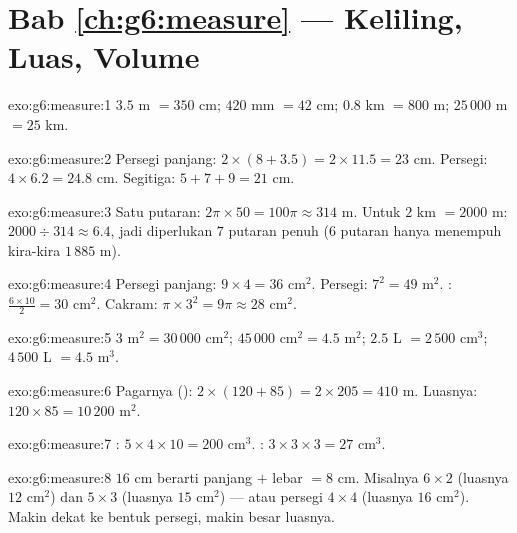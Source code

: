\section*{Bab \ref{ch:g6:measure} --- Keliling, Luas, Volume}

\begin{solution}{exo:g6:measure:1}
$3.5$ m $= 350$ cm; \quad $420$ mm $= 42$ cm; \quad
$0.8$ km $= 800$ m; \quad $25\,000$ m $= 25$ km.
\end{solution}

\begin{solution}{exo:g6:measure:2}
Persegi panjang: $2 \times (8 + 3.5) = 2 \times 11.5 = 23$ cm.
Persegi: $4 \times 6.2 = 24.8$ cm.
Segitiga: $5 + 7 + 9 = 21$ cm.
\end{solution}

\begin{solution}{exo:g6:measure:3}
Satu putaran: $2\pi \times 50 = 100\pi \approx 314$ m. Untuk $2$ km
$= 2000$ m: $2000 \div 314 \approx 6.4$, jadi diperlukan $7$ putaran
penuh ($6$ putaran hanya menempuh kira-kira $1\,885$ m).
\end{solution}

\begin{solution}{exo:g6:measure:4}
Persegi panjang: $9 \times 4 = 36$ cm$^2$. Persegi: $7^2 = 49$ m$^2$.
: $\frac{6 \times 10}{2} = 30$ cm$^2$.
Cakram: $\pi \times 3^2 = 9\pi \approx 28$ cm$^2$.
\end{solution}

\begin{solution}{exo:g6:measure:5}
$3$ m$^2 = 30\,000$ cm$^2$; \quad
$45\,000$ cm$^2 = 4.5$ m$^2$; \quad
$2.5$ L $= 2\,500$ cm$^3$; \quad
$4\,500$ L $= 4.5$ m$^3$.
\end{solution}

\begin{solution}{exo:g6:measure:6}
Pagarnya (): $2 \times (120 + 85) = 2 \times 205 = 410$ m.
Luasnya: $120 \times 85 = 10\,200$ m$^2$.
\end{solution}

\begin{solution}{exo:g6:measure:7}
: $5 \times 4 \times 10 = 200$ cm$^3$. :
$3 \times 3 \times 3 = 27$ cm$^3$.
\end{solution}

\begin{solution}{exo:g6:measure:8}
 $16$ cm berarti panjang $+$ lebar $= 8$ cm. Misalnya
$6 \times 2$ (luasnya $12$ cm$^2$) dan $5 \times 3$ (luasnya $15$
cm$^2$) --- atau persegi $4 \times 4$ (luasnya $16$ cm$^2$). Makin
dekat ke bentuk persegi, makin besar luasnya.
\end{solution}

